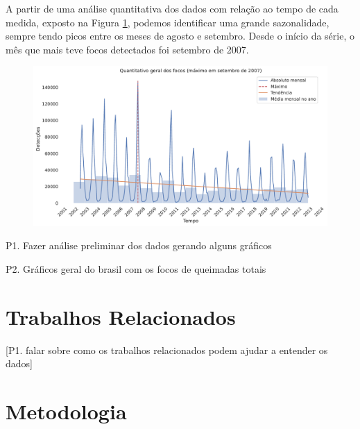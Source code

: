 \documentclass[cic,tc]{iiufrgs}
\begin{document}
A partir de uma análise quantitativa dos dados com relação ao tempo de cada medida, exposto na Figura \ref{fig:quantitativo_geral}, podemos identificar uma grande sazonalidade, sempre tendo picos entre os meses de agosto e setembro. Desde o início da série, o mês que mais teve focos detectados foi setembro de 2007. 

\begin{figure}[H]
    \caption{}
    \begin{center}
        \includegraphics[width=35em]{quantitativo_geral}
    \end{center}
    \label{fig:quantitativo_geral}
\end{figure}


P1. Fazer análise preliminar dos dados gerando alguns gráficos \par
P2. Gráficos geral do brasil com os focos de queimadas totais \cite{geographicDataSciencePython} \par



\chapter{Trabalhos Relacionados}

[P1. falar sobre como os trabalhos relacionados podem ajudar a entender 
os dados] \par



\chapter{Metodologia}
\end{document}
